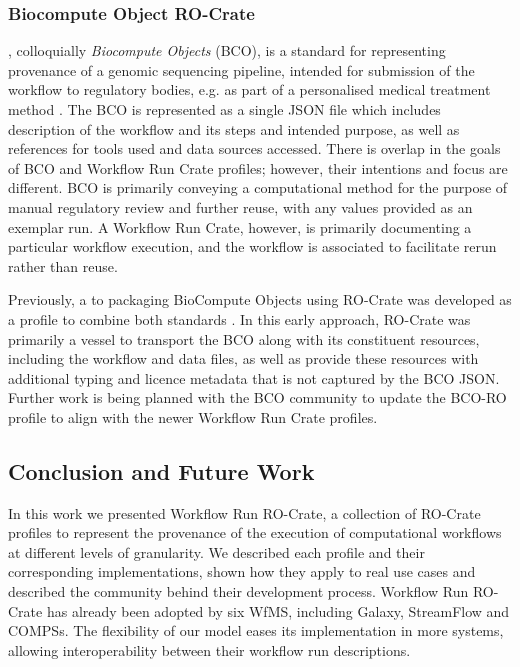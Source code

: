 \subsubsection{Biocompute Object RO-Crate}\label{ch54:bco-crate}
\cite{IEEE 2791-2020}, colloquially \emph{Biocompute Objects} (BCO), is a standard for representing provenance of a genomic sequencing pipeline, intended for submission of the workflow to regulatory bodies, e.g. as part of a personalised medical treatment method \cite{Alterovitz 2018}. 
The BCO is represented as a single JSON file which includes description of the workflow and its steps and intended purpose, as well as references for tools used and data sources accessed. 
There is overlap in the goals of BCO and Workflow Run Crate profiles; however, their intentions and focus are different. 
BCO is primarily conveying a computational method for the purpose of manual regulatory review and further reuse, with any values provided as an exemplar run.  
A Workflow Run Crate, however, is primarily documenting a particular workflow execution, and the workflow is associated to facilitate rerun rather than reuse. 

Previously, a  to packaging BioCompute Objects using RO-Crate was developed as a profile to combine both standards \cite{Soiland-Reyes 2021}.
In this early approach, RO-Crate was primarily a vessel to transport the BCO along with its constituent resources, including the workflow and data files, as well as provide these resources with additional typing and licence metadata that is not captured by the BCO JSON. 
Further work is being planned with the BCO community to update the BCO-RO profile to align with the newer Workflow Run Crate profiles. 

\subsection{Conclusion and Future Work}\label{ch54:conclusion}

In this work we presented Workflow Run RO-Crate, a collection of RO-Crate profiles to represent the provenance of the execution of computational workflows at different levels of granularity.
We described each profile and their corresponding implementations, shown how they apply to real use cases and described the community behind their development process.
Workflow Run RO-Crate has already been adopted by six WfMS, including Galaxy, StreamFlow and COMPSs. The flexibility of our model eases its implementation in more systems, allowing interoperability between their workflow run descriptions.

